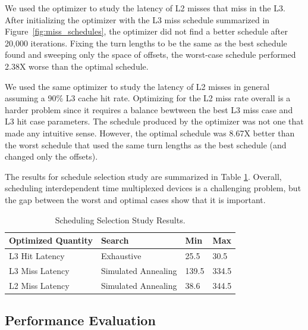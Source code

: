 We used the optimizer to study the latency of L2 misses that miss in the L3.
After initializing the optimizer with the L3 miss schedule summarized in 
Figure~\ref{fig:miss_schedules}, the optimizer did not find a better schedule 
after 20,000 iterations. Fixing the turn lengths to be the same as the best 
schedule found and sweeping only the space of offsets,
the worst-case schedule performed 2.38X
worse than the optimal schedule.

We used the same optimizer to study the latency of L2 misses in general 
assuming a 90\% L3 cache hit rate.
Optimizing for the L2 miss rate overall is a harder problem since it requires a 
balance bewtween the best L3 miss case and L3 hit case parameters. The schedule 
produced by the optimizer was not one that made any intuitive sense.  However, 
the optimal schedule was 8.67X better than the worst schedule that used the 
same turn lengths as the best schedule (and changed only the offsets).

The results for schedule selection study are summarized in Table 
\ref{tab:coord_results}. Overall, scheduling interdependent time multiplexed 
devices is a challenging problem, but the gap between the worst and optimal 
cases show that it is important.

\begin{table}
    \caption{Scheduling Selection Study Results.}
    \centering
    \begin{tabular}{|l|l|l|l|}
        \hline
        \multicolumn{1}{|l|}{Optimized Quantity} & Search & Min & Max \\\hline
        \multicolumn{1}{|l|}{L3 Hit Latency} & Exhaustive & 25.5 & 30.5 
        \\\hline
        \multicolumn{1}{|l|}{L3 Miss Latency} & Simulated Annealing& 139.5 & 
        334.5 \\\hline
        \multicolumn{1}{|l|}{L2 Miss Latency} & Simulated Annealing& 38.6 & 
        344.5 \\\hline
    \end{tabular}
    \label{tab:coord_results}
\end{table}

\subsection{Performance Evaluation}


